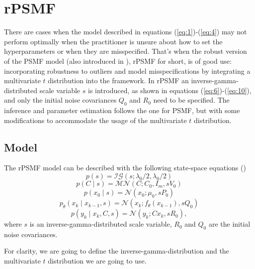 \documentclass{mldsmsc}
\begin{document}
\section{rPSMF}

There are cases when the model described in equations (\ref{eq:1})-(\ref{eq:4}) may not perform optimally when the practitioner is unsure about how to set the hyperparameters or when they are misspecified. That's when the robust version of the PSMF model (also introduced in \cite{akyildiz2021probabilistic}), rPSMF for short, is of good use: incorporating robustness to outliers and model misspecifications by integrating a multivariate $t$ distribution into the framework. In rPSMF an inverse-gamma-distributed scale variable $s$ is introduced, as shown in equations (\ref{eq:6})-(\ref{eq:10}), and only the initial noise covariances $Q_0$ and $R_0$ need to be specified. The inference and parameter estimation follows the one for PSMF, but with some modifications to accommodate the usage of the multivariate $t$ distribution.

\subsection{Model}

The rPSMF model can be described with the following state-space equations (\cite{akyildiz2021probabilistic})
\begin{equation}\label{eq:6}
    p(s) = \mathcal{IG}(s; \lambda_0 / 2, \lambda_0 / 2)
\end{equation}
\begin{equation}\label{eq:7}
    p(C \mid s) = \mathcal{MN}(C; C_0, I_m, sV_0)
\end{equation}
\begin{equation}\label{eq:8}
    p(x_0 \mid s) = \mathcal{N}(x_0; \mu_0, sP_0)
\end{equation}
\begin{equation}\label{eq:9}
    p_{\theta}(x_k \mid x_{k-1}, s) = \mathcal{N}(x_k; f_{\theta}(x_{k-1}), sQ_0)
\end{equation}
\begin{equation}\label{eq:10}
    p(y_k \mid x_k, C, s) = \mathcal{N}(y_k; Cx_k, sR_0),
\end{equation}
where $s$ is an inverse-gamma-distributed scale variable, $R_0$ and $Q_0$ are the initial noise covariances. \newline

\noindent For clarity, we are going to define the inverse-gamma-distribution and the multivariate $t$ distribution we are going to use.
\end{document}
